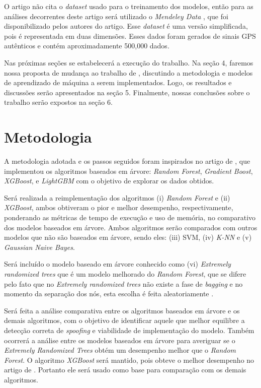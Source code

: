 \documentclass[12pt]{article}
\begin{document}
O artigo \cite{Aissou2021} não cita o \textit{dataset}
usado para o treinamento dos modelos, 
então para as análises decorrentes deste artigo
será utilizado o \textit{Mendeley Data} 
\cite{aissou2022dataset}, que foi disponibilizado pelos autores do artigo. 
Esse \textit{dataset} é uma versão simplificada,
pois é representada em duas dimensões. Esses dados foram gerados de sinais
GPS autênticos e contém aproximadamente 500,000 dados.

Nas próximas seções se estabelecerá a execução do trabalho.
Na seção 4, faremos nossa proposta de mudança
ao trabalho de \cite{Aissou2021}, discutindo a 
metodologia e modelos de aprendizado de máquina a
serem implementados. Logo, os resultados e 
discussões serão apresentados na seção 5.
Finalmente, nossas conclusões sobre o trabalho serão expostos na seção 6.

\section{Metodologia}
A metodologia adotada e os passos seguidos
foram inspirados no artigo de \cite{Aissou2021}, 
que implementou os algoritmos baseados em árvore: 
\textit{Random Forest}, \textit{Gradient Boost}, \textit{XGBoost}, e 
\textit{LightGBM} com o objetivo de explorar os dados obtidos.

Será realizada a reimplementação dos algoritmos
(i) \textit{Random Forest} e (ii) \textit{XGBoost},
ambos obtiveram o pior e melhor desempenho,
respectivamente, ponderando as métricas de tempo de execução e uso de memória,
no comparativo dos modelos baseados em árvore.
Ambos algoritmos serão comparados com outros
modelos que não são baseados em árvore,
sendo eles: (iii) SVM, (iv) \textit{K-NN} e
(v) \textit{Gaussian Naive Bayes}.

Será incluído o modelo baseado em árvore conhecido como
(vi) \textit{Extremely randomized trees} que é um modelo melhorado
do \textit{Random Forest}, que se difere pelo fato
que no \textit{Extremely randomized trees} não existe a fase
de \textit{bagging} e no momento da separação dos nós,
esta escolha é feita aleatoriamente \cite{geurtsExtremelyRandomizedTrees2006}.

Será feita a análise comparativa entre os algoritmos baseados em árvore
e os demais algoritmos, com o objetivo de identificar
aquele que melhor equilibre a detecção correta
de \textit{spoofing} e viabilidade de implementação do modelo.
Também ocorrerá a análise entre os modelos baseados em árvore
para averiguar se o \textit{Extremely Randomized Trees}
obtém um desempenho melhor que o \textit{Random Forest}.
O algoritmo \textit{XGBoost}
será mantido, pois obteve o melhor desempenho
no artigo de \cite{Aissou2021}.
Portanto ele será usado como base
para comparação com os demais algoritmos.
\end{document}
